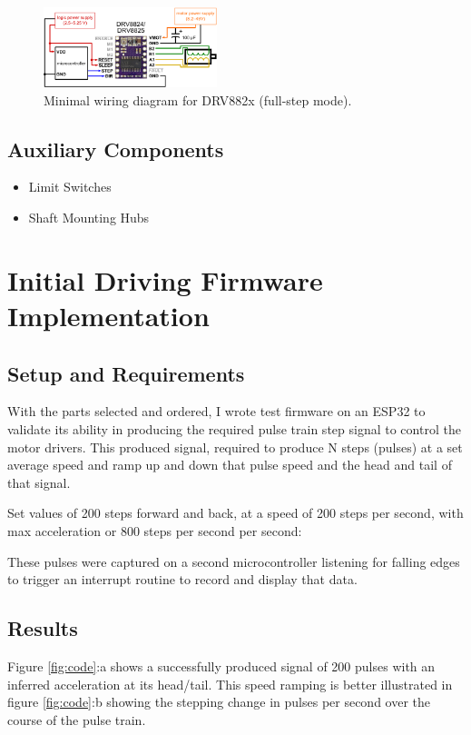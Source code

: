 \begin{figure}[h]
    \centering
    \includegraphics[width=0.45\textwidth]{img/stepper_driver schem_diagram.png}
    \caption{Minimal wiring diagram for DRV882x (full-step mode). \cite{pololu}}
\end{figure}

\subsection{Auxiliary Components}
\begin{itemize}
    \item Limit Switches
    \item Shaft Mounting Hubs 
\end{itemize}

\section{Initial Driving Firmware Implementation}
\subsection{Setup and Requirements}
With the parts selected and ordered, I wrote test firmware on an ESP32 to validate its ability in producing the required pulse train step signal to control the motor drivers. This produced signal, required to produce N steps (pulses) at a set average speed and ramp up and down that pulse speed and the head and tail of that signal.

Set values of 200 steps forward and back, at a speed of 200 steps per second, with max acceleration or 800 steps per second per second:

These pulses were captured on a second microcontroller listening for falling edges to trigger an interrupt routine to record and display that data.

\subsection{Results}

Figure \ref{fig:code}:a shows a successfully produced signal of 200 pulses with an inferred acceleration at its head/tail. This speed ramping is better illustrated in figure \ref{fig:code}:b showing the stepping change in pulses per second over the course of the pulse train.


